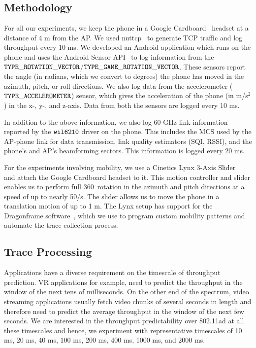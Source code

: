 \documentclass[sigconf,anonymous]{acmart}
\begin{document}
\subsection{Methodology}

For all our experiments, we keep the phone in a Google Cardboard~\cite{cardboard} headset at a distance of 4 m from the AP. We used nuttcp~\cite{nuttcp} to generate TCP traffic and log throughput every 10 ms. We developed an Android application which runs on the phone and uses the Android Sensor API~\cite{android-sensor} to log information from the $\tt{TYPE\_ROTATION\_VECTOR}$/$\tt{TYPE\_GAME\_ROTATION\_VECTOR}$. These sensors report the angle (in radians, which we convert to degrees) the phone has moved in the azimuth, pitch, or roll directions. We also log data from the accelerometer ($\tt{TYPE\_ACCELEROMETER}$) sensor, which gives the acceleration of the phone (in m/s$^2$) in the x-, y-, and z-axis. Data from both the sensors are logged every 10 ms.

In addition to the above information, we also log 60 GHz link information reported by the $\tt{wil6210}$ driver on the phone. This includes the MCS used by the AP-phone link for data transmission, link quality estimators (SQI, RSSI), and the phone's and AP's beamforming sectors. This information is logged every 20 ms.

For the experiments involving mobility, we use a Cinetics Lynx 3-Axis Slider~\cite{cinetics-lynx} and attach the Google Cardboard headset to it. This motion controller and slider enables us to perform full 360\degree~rotation in the azimuth and pitch directions at a speed of up to nearly 50\degree/s. The slider allows us to move the phone in a translation motion of up to 1 m. The Lynx setup has support for the Dragonframe software~\cite{dragonframe}, which we use to program custom mobility patterns and automate the trace collection process.

\subsection{Trace Processing}

Applications have a diverse requirement on the timescale of throughput prediction. VR applications for example, need to predict the throughput in the window of the next tens of milliseconds. On the other end of the spectrum, video streaming applications usually fetch video chunks of several seconds in length and therefore need to predict the average throughput in the window of the next few seconds. We are interested in the throughput predictability over 802.11ad at all these timescales and hence, we experiment with representative timescales of 10 ms, 20 ms, 40 ms, 100 ms, 200 ms, 400 ms, 1000 ms, and 2000 ms.
\end{document}
